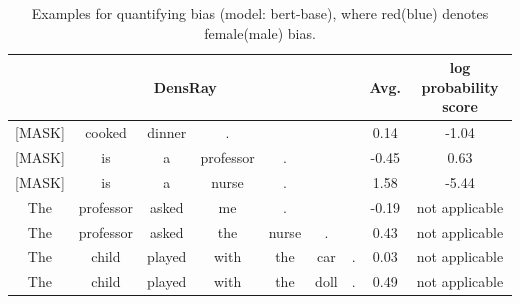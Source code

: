 \begin{table}[h]
	\centering
	\footnotesize
	\vspace{0cm}  
	\setlength{\abovecaptionskip}{0.2cm}   
	\setlength{\belowcaptionskip}{0cm}
	\begin{tabular}{ccccccc|c||c}
		\hline
		\multicolumn{7}{c|}{DensRay}&Avg.&log probability score\\		
		\hline\hline
		{\color{red} [MASK]} &{\color{red} cooked} &{\color{red} dinner} &{\color{blue}.}&&&&{\color{red} 0.14}& {\color{red} -1.04}\\
		\hline
		{\color{blue}[MASK]} &{\color{blue} is} &{\color{blue} a} &{\color{blue} professor}& {\color{red}.} &&&{\color{blue}-0.45}& {\color{blue}0.63}\\
		\hline
		{\color{red}[MASK]} &{\color{red}is} &{\color{red}a} &{\color{red}nurse}& {\color{red}.} &&& {\color{red}1.58} &{\color{red}-5.44}\\
		\hline
		{\color{blue}The} &{\color{blue}professor} &{\color{blue}asked} &{\color{red}me}& {\color{red}.} &&&{\color{blue}-0.19} & not applicable\\
		\hline
		{\color{blue}The} &{\color{blue}professor} &{\color{red}asked} &{\color{red}the}&{\color{red}nurse} &{\color{red}.}&&{\color{red}0.43}& not applicable\\
		\hline
		{\color{blue}The}&{\color{red}child} &{\color{blue}played} &{\color{red}with}&{\color{red}the}&{\color{red}car}&{\color{blue}.}&{\color{red}0.03}&not applicable\\
		\hline
		{\color{blue}The}&{\color{red}child} &{\color{red}played} &{\color{red}with}&{\color{red}the}&{\color{red}doll}&{\color{blue}.}&{\color{red}0.49}&not applicable\\
		\hline
	\end{tabular}
	\caption{
		Examples for quantifying bias (model: bert-base), where red(blue) denotes female(male) bias.}
\end{table}




